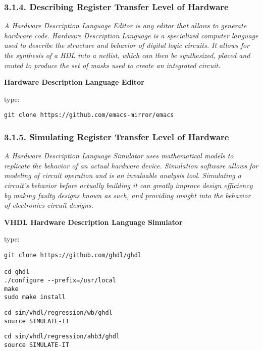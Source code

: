 \documentclass[]{article}
\begin{document}
\subsubsection{3.1.4. Describing Register Transfer Level of
Hardware}\label{describing-register-transfer-level-of-hardware}

\emph{A Hardware Description Language Editor is any editor that allows
to generate hardware code. Hardware Description Language is a
specialized computer language used to describe the structure and
behavior of digital logic circuits. It allows for the synthesis of a HDL
into a netlist, which can then be synthesized, placed and routed to
produce the set of masks used to create an integrated circuit.}

\textbf{Hardware Description Language Editor}

type:

\begin{verbatim}
git clone https://github.com/emacs-mirror/emacs
\end{verbatim}

\subsubsection{3.1.5. Simulating Register Transfer Level of
Hardware}\label{simulating-register-transfer-level-of-hardware}

\emph{A Hardware Description Language Simulator uses mathematical models
to replicate the behavior of an actual hardware device. Simulation
software allows for modeling of circuit operation and is an invaluable
analysis tool. Simulating a circuit's behavior before actually building
it can greatly improve design efficiency by making faulty designs known
as such, and providing insight into the behavior of electronics circuit
designs.}

\textbf{VHDL Hardware Description Language Simulator}

type:

\begin{verbatim}
git clone https://github.com/ghdl/ghdl

cd ghdl
./configure --prefix=/usr/local
make
sudo make install
\end{verbatim}

\begin{verbatim}
cd sim/vhdl/regression/wb/ghdl
source SIMULATE-IT
\end{verbatim}

\begin{verbatim}
cd sim/vhdl/regression/ahb3/ghdl
source SIMULATE-IT
\end{verbatim}
\end{document}
